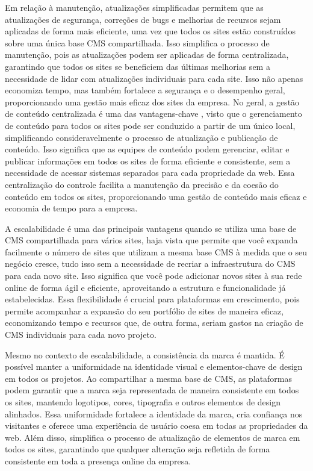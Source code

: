 Em relação à manutenção, atualizações simplificadas permitem que as atualizações de segurança, correções de bugs e melhorias de recursos sejam aplicadas de forma mais eficiente, uma vez que todos os sites estão construídos sobre uma única base CMS compartilhada. Isso simplifica o processo de manutenção, pois as atualizações podem ser aplicadas de forma centralizada, garantindo que todos os sites se beneficiem das últimas melhorias sem a necessidade de lidar com atualizações individuais para cada site. Isso não apenas economiza tempo, mas também fortalece a segurança e o desempenho geral, proporcionando uma gestão mais eficaz dos sites da empresa. No geral, a gestão de conteúdo centralizada é uma das vantagens-chave , visto que o gerenciamento de conteúdo para todos os sites pode ser conduzido a partir de um único local, simplificando consideravelmente o processo de atualização e publicação de conteúdo. Isso significa que as equipes de conteúdo podem gerenciar, editar e publicar informações em todos os sites de forma eficiente e consistente, sem a necessidade de acessar sistemas separados para cada propriedade da web. Essa centralização do controle facilita a manutenção da precisão e da coesão do conteúdo em todos os sites, proporcionando uma gestão de conteúdo mais eficaz e economia de tempo para a empresa.

A escalabilidade é uma das principais vantagens quando se utiliza uma base de CMS compartilhada para vários sites, haja vista que permite que você expanda facilmente o número de sites que utilizam a mesma base CMS à medida que o seu negócio cresce, tudo isso sem a necessidade de recriar a infraestrutura do CMS para cada novo site. Isso significa que você pode adicionar novos sites à sua rede online de forma ágil e eficiente, aproveitando a estrutura e funcionalidade já estabelecidas. Essa flexibilidade é crucial para plataformas em crescimento, pois permite acompanhar a expansão do seu portfólio de sites de maneira eficaz, economizando tempo e recursos que, de outra forma, seriam gastos na criação de CMS individuais para cada novo projeto.

Mesmo no contexto de escalabilidade, a consistência da marca é mantida. É possível manter a uniformidade na identidade visual e elementos-chave de design em todos os projetos. Ao compartilhar a mesma base de CMS, as plataformas podem garantir que a marca seja representada de maneira consistente em todos os sites, mantendo logotipos, cores, tipografia e outros elementos de design alinhados. Essa uniformidade fortalece a identidade da marca, cria confiança nos visitantes e oferece uma experiência de usuário coesa em todas as propriedades da web. Além disso, simplifica o processo de atualização de elementos de marca em todos os sites, garantindo que qualquer alteração seja refletida de forma consistente em toda a presença online da empresa.

